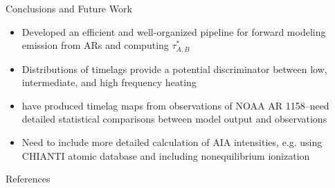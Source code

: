 \documentclass[final]{beamer}
\begin{document}
\begin{frame}
\begin{columns}[T]
\begin{column}{0.49\linewidth}
\begin{block}{Conclusions and Future Work}
        \vspace{-1ex}
        \begin{itemize}
            \item Developed an efficient and well-organized pipeline for forward modeling emission from ARs and computing $\tau^*_{A,B}$
            \item Distributions of timelags provide a potential discriminator between low, intermediate, and high frequency heating
            \item \citet{viall_survey_2017} have produced timelag maps from observations of NOAA AR 1158--need detailed statistical comparisons between model output and observations
            \item Need to include more detailed calculation of AIA intensities, e.g. using CHIANTI atomic database \citep{dere_chianti_1997,young_chianti_2016} and including nonequilibrium ionization
        \end{itemize}
        \vspace{-1ex}
    \end{block}
    \begin{block}{References}
      \scriptsize
      \begin{multicols}{2}
        
        
      \end{multicols}
    \end{block}
  \end{column}
  \end{columns}
\end{frame}
\end{document}
